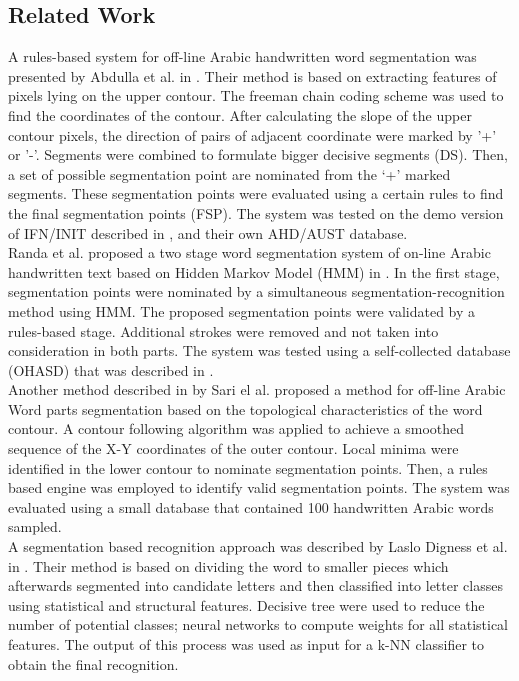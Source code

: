 \documentclass[12pt,journal,compsoc]{IEEEtran}
\begin{document}
\subsection{Related Work}
A rules-based system for off-line Arabic handwritten word segmentation was presented by Abdulla et al. in \cite{abdulla2008off}. Their method is based on extracting features of pixels lying on the upper contour. The freeman chain coding scheme was used to find the coordinates of the contour. After calculating the slope of the upper contour pixels, the direction of pairs of adjacent coordinate were marked by '+' or '-'. Segments were combined to formulate bigger decisive segments (DS). Then, a set of possible segmentation point are nominated from the ‘+’ marked segments. These segmentation points were evaluated using a certain rules to find the final segmentation points (FSP). The system was tested on the demo version of IFN/INIT described in \cite{pechwitz2002ifn} , and their own AHD/AUST database.\\

Randa et al. proposed a two stage word segmentation system of on-line Arabic handwritten text based on Hidden Markov Model (HMM) in \cite{elanwar2012unconstrained}. In the first stage, segmentation points were nominated by a simultaneous segmentation-recognition method using HMM. The proposed segmentation points were validated by a rules-based stage. Additional strokes were removed and not taken into consideration in both parts. The system was tested using a self-collected database (OHASD) that was described in \cite{elanwar2010ohasd}.\\

Another method described in \cite{sari2002off} by Sari el al. proposed a method for off-line Arabic Word parts segmentation based on the topological characteristics of the word contour. A contour following  algorithm was applied to achieve a smoothed sequence of the X-Y coordinates of the outer contour. Local minima were identified in the lower contour to nominate segmentation points. Then, a rules based engine was employed to identify valid segmentation points. The system was evaluated using a small database that contained 100 handwritten Arabic words sampled.\\

A segmentation based recognition approach was described by Laslo Digness et al. in \cite{Dinges2011}. Their method is based on dividing the word to smaller pieces which afterwards segmented into candidate letters and then classified into letter classes using statistical and structural features. Decisive tree were used to reduce the number of potential classes; neural networks to compute weights for all statistical features. The output of this process was used as input for a k-NN classifier to obtain the final recognition.\\
\end{document}
